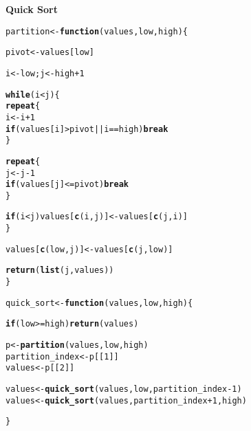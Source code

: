 \documentclass[11pt, a4paper]{article}\usepackage[]{graphicx}\usepackage[]{xcolor}
\makeatletter
\newcommand{\hlnum}[1]{\textcolor[rgb]{0.686,0.059,0.569}{#1}}%
\newcommand{\hlopt}[1]{\textcolor[rgb]{0,0,0}{#1}}%
\newcommand{\hldef}[1]{\textcolor[rgb]{0.345,0.345,0.345}{#1}}%
\newcommand{\hlkwa}[1]{\textcolor[rgb]{0.161,0.373,0.58}{\textbf{#1}}}%
\newcommand{\hlkwb}[1]{\textcolor[rgb]{0.69,0.353,0.396}{#1}}%
\newcommand{\hlkwc}[1]{\textcolor[rgb]{0.333,0.667,0.333}{#1}}%
\newcommand{\hlkwd}[1]{\textcolor[rgb]{0.737,0.353,0.396}{\textbf{#1}}}%
\newenvironment{kframe}{%
 \def\at@end@of@kframe{}%
 \ifinner\ifhmode%
  \def\at@end@of@kframe{\end{minipage}}%
  \begin{minipage}{\columnwidth}%
 \fi\fi%
 \def\FrameCommand##1{\hskip\@totalleftmargin \hskip-\fboxsep
 \colorbox{shadecolor}{##1}\hskip-\fboxsep
     \hskip-\linewidth \hskip-\@totalleftmargin \hskip\columnwidth}%
 \MakeFramed {\advance\hsize-\width
   \@totalleftmargin\z@ \linewidth\hsize
   \@setminipage}}%
 {\par\unskip\endMakeFramed%
 \at@end@of@kframe}
\newenvironment{knitrout}{}{} %
\makeatother
\begin{document}
\faArrowAltCircleRight[regular] \hspace{0.5cm} \textbf{Quick Sort}

\begin{knitrout}
\color{fgcolor}\begin{kframe}
\begin{alltt}
\hldef{partition} \hlkwb{<-} \hlkwa{function}\hldef{(}\hlkwc{values}\hldef{,} \hlkwc{low}\hldef{,} \hlkwc{high}\hldef{)\{}

  \hldef{pivot} \hlkwb{<-} \hldef{values[low]}

  \hldef{i} \hlkwb{<-} \hldef{low; j} \hlkwb{<-} \hldef{high} \hlopt{+} \hlnum{1}

  \hlkwa{while}\hldef{(i} \hlopt{<} \hldef{j)\{}
    \hlkwa{repeat}\hldef{\{}
      \hldef{i} \hlkwb{<-} \hldef{i} \hlopt{+} \hlnum{1}
      \hlkwa{if}\hldef{(values[i]} \hlopt{>} \hldef{pivot} \hlopt{||} \hldef{i} \hlopt{==} \hldef{high)} \hlkwa{break}
    \hldef{\}}

    \hlkwa{repeat}\hldef{\{}
      \hldef{j} \hlkwb{<-} \hldef{j} \hlopt{-} \hlnum{1}
      \hlkwa{if}\hldef{(values[j]} \hlopt{<=} \hldef{pivot)} \hlkwa{break}
    \hldef{\}}

    \hlkwa{if}\hldef{(i} \hlopt{<} \hldef{j) values[}\hlkwd{c}\hldef{(i, j)]} \hlkwb{<-} \hldef{values[}\hlkwd{c}\hldef{(j, i)]}
  \hldef{\}}

  \hldef{values[}\hlkwd{c}\hldef{(low, j)]} \hlkwb{<-} \hldef{values[}\hlkwd{c}\hldef{(j, low)]}

  \hlkwd{return}\hldef{(}\hlkwd{list}\hldef{(j, values))}
\hldef{\}}
\end{alltt}
\end{kframe}
\end{knitrout}

\newpage

\begin{knitrout}
\color{fgcolor}\begin{kframe}
\begin{alltt}
\hldef{quick_sort} \hlkwb{<-} \hlkwa{function}\hldef{(}\hlkwc{values}\hldef{,} \hlkwc{low}\hldef{,} \hlkwc{high}\hldef{)\{}

  \hlkwa{if}\hldef{(low} \hlopt{>=} \hldef{high)} \hlkwd{return}\hldef{(values)}

  \hldef{p} \hlkwb{<-} \hlkwd{partition}\hldef{(values, low, high)}
  \hldef{partition_index} \hlkwb{<-} \hldef{p[[}\hlnum{1}\hldef{]]}
  \hldef{values} \hlkwb{<-} \hldef{p[[}\hlnum{2}\hldef{]]}

  \hldef{values} \hlkwb{<-} \hlkwd{quick_sort}\hldef{(values, low, partition_index} \hlopt{-} \hlnum{1}\hldef{)}
  \hldef{values} \hlkwb{<-} \hlkwd{quick_sort}\hldef{(values, partition_index} \hlopt{+} \hlnum{1}\hldef{, high)}

\hldef{\}}
\end{alltt}
\end{kframe}
\end{knitrout}
\end{document}
